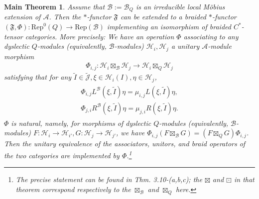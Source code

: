 \documentclass[11pt,b5paper,notitlepage]{article}
\theoremstyle{definition}
\theoremstyle{plain}
\newtheorem{Mthm}{Main Theorem}
\newcommand{\fk}{\mathfrak}
\newcommand{\mc}{\mathcal}
\newcommand{\wtd}{\widetilde}
\newcommand{\Rep}{\mathrm{Rep}}
\newcommand{\Jtd}{\widetilde{\mathcal J}}
\numberwithin{equation}{section}
\begin{document}
\begin{Mthm}\label{lb24}
Assume that $\mc B:=\mc B_Q$ is an irreducible local M\"obius extension of $\mc A$. Then the $*$-functor $\fk F$ can be extended to a braided $*$-functor $(\fk F,\Phi):\Rep^0(Q)\rightarrow\Rep(\mc B)$ implementing an isomorphism of braided $C^*$-tensor categories. More precisely: We have an operation $\Phi$ associating to any dyslectic $Q$-modules (equivalently, $\mc B$-modules) $\mc H_i,\mc H_j$ a unitary $\mc A$-module morphism
\begin{align}
\Phi_{i,j}:	\mc H_i\boxtimes_{\mc B}\mc H_j\rightarrow\mc H_i\boxtimes_Q\mc H_j
\end{align}
satisfying that for any $\wtd I\in\Jtd,\xi\in\mc H_i(I),\eta\in\mc H_j$,
\begin{gather}
\begin{gathered}
\Phi_{i,j}L^{\mc B}(\xi,\wtd I)\eta=\mu_{i,j}L(\xi,\wtd I)\eta,\\
\Phi_{j,i}R^{\mc B}(\xi,\wtd I)\eta=\mu_{j,i}R(\xi,\wtd I)\eta.
\end{gathered}	
\end{gather}
$\Phi$ is natural, namely, for morphisms of dyslectic $Q$-modules (equivalently, $\mc B$-modules) $F:\mc H_i\rightarrow\mc H_{i'},G:\mc H_j\rightarrow\mc H_{j'}$, we have $\Phi_{i,j}(F\boxtimes_{\mc B}G)=(F\boxtimes_QG)\Phi_{i,j}$. Then  the unitary equivalence of the associators, unitors, and braid operators of the two categories are implemented by $\Phi$.\footnote{The precise statement can be found in \cite{Gui21a} Thm. 3.10-(a,b,c); the $\boxtimes$ and $\boxdot$ in that theorem correspond respectively to the $\boxtimes_{\mc B}$ and $\boxtimes_Q$ here.}
\end{Mthm}
\end{document}
